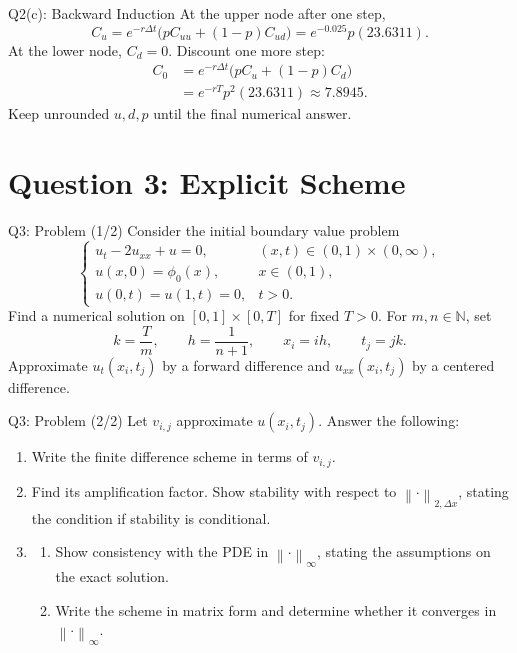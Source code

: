 \documentclass{beamer}
\newcommand{\norm}[1]{\left\|#1\right\|}
\begin{document}
\begin{frame}{Q2(c): Backward Induction}
At the upper node after one step,
\[
C_u=e^{-r\Delta t}\bigl(pC_{uu}+(1-p)C_{ud}\bigr)
=e^{-0.025}p(23.6311).
\]
At the lower node, $C_d=0$. Discount one more step:
\[
\begin{aligned}
C_0
&=e^{-r\Delta t}\bigl(pC_u+(1-p)C_d\bigr)\\
&=e^{-rT}p^2(23.6311)
\approx\boxed{7.8945}.
\end{aligned}
\]
Keep unrounded $u,d,p$ until the final numerical answer.
\end{frame}

\section{Question 3: Explicit Scheme}

\begin{frame}{Q3: Problem (1/2)}
\small
Consider the initial boundary value problem
\[
\begin{cases}
u_t-2u_{xx}+u=0, &(x,t)\in(0,1)\times(0,\infty),\\
u(x,0)=\phi_0(x), &x\in(0,1),\\
u(0,t)=u(1,t)=0, &t>0.
\end{cases}
\]
Find a numerical solution on $[0,1]\times[0,T]$ for fixed $T>0$.
For $m,n\in\mathbb N$, set
\[
k=\frac{T}{m},\qquad h=\frac{1}{n+1},\qquad
x_i=ih,\qquad t_j=jk.
\]
Approximate $u_t(x_i,t_j)$ by a forward difference and
$u_{xx}(x_i,t_j)$ by a centered difference.
\end{frame}

\begin{frame}{Q3: Problem (2/2)}
\small
Let $v_{i,j}$ approximate $u(x_i,t_j)$. Answer the following:
\begin{enumerate}
\item[(a)] Write the finite difference scheme in terms of $v_{i,j}$.
\item[(b)] Find its amplification factor. Show stability with respect to
$\norm{\cdot}_{2,\Delta x}$, stating the condition if stability is
conditional.
\item[(c)] \begin{enumerate}
\item[(i)] Show consistency with the PDE in $\norm{\cdot}_\infty$,
stating the assumptions on the exact solution.
\item[(ii)] Write the scheme in matrix form and determine whether
it converges in $\norm{\cdot}_\infty$.
\end{enumerate}
\end{enumerate}
\end{frame}
\end{document}
